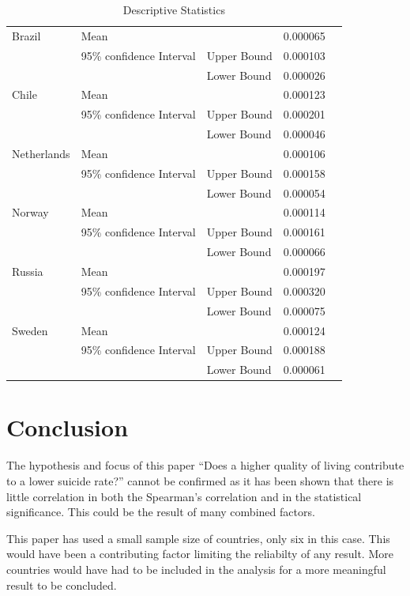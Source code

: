 \documentclass[conference]{IEEEtran}
\begin{document}
\begin{table}[ht]
    \centering
    \caption{Descriptive Statistics}
    \begin{tabular}{| l | l | lll |}
    \hline
     Brazil&  Mean&  &  0.000065&   \\
     &  95\% confidence Interval&  Upper Bound&  0.000103&   \\
     &  &  Lower Bound&  0.000026&   \\
     Chile&  Mean&  &  0.000123&   \\
     &  95\% confidence Interval&  Upper Bound&  0.000201&   \\
     &  &  Lower Bound&  0.000046&   \\
     Netherlands&  Mean&  &  0.000106&   \\
     &  95\% confidence Interval&  Upper Bound& 0.000158&   \\
     &  &  Lower Bound&  0.000054&   \\
     Norway&  Mean&  &  0.000114&   \\
     &  95\% confidence Interval&  Upper Bound&  0.000161&   \\
     &  &  Lower Bound&  0.000066&   \\
     Russia&  Mean&  &  0.000197&   \\
     &  95\% confidence Interval&  Upper Bound&  0.000320&   \\
     &  &  Lower Bound&  0.000075&   \\
     Sweden&  Mean&  &  0.000124&   \\
     &  95\% confidence Interval&  Upper Bound&  0.000188&   \\
     &  &  Lower Bound&  0.000061& \\\hline
    \end{tabular}
    \end{table}

\section{Conclusion}
The hypothesis and focus of this paper ``Does a higher quality of living contribute to a lower suicide rate?'' cannot be confirmed as
it has been shown that there is little correlation in both the Spearman's correlation and in the statistical significance.
This could be the result of many combined factors.

This paper has used a small sample size of countries, only six in this case. This would have been a contributing factor limiting the reliabilty of any result.
More countries would have had to be included in the analysis for a more meaningful result to be concluded.
\end{document}

